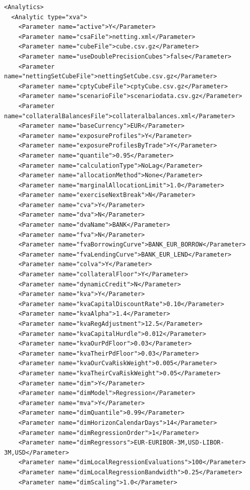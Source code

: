 \begin{listing}[H]
\begin{verbatim}
<Analytics>
  <Analytic type="xva">
    <Parameter name="active">Y</Parameter>
    <Parameter name="csaFile">netting.xml</Parameter>
    <Parameter name="cubeFile">cube.csv.gz</Parameter>
    <Parameter name="useDoublePrecisionCubes">false</Parameter>
    <Parameter name="nettingSetCubeFile">nettingSetCube.csv.gz</Parameter>
    <Parameter name="cptyCubeFile">cptyCube.csv.gz</Parameter>
    <Parameter name="scenarioFile">scenariodata.csv.gz</Parameter>
    <Parameter name="collateralBalancesFile">collateralbalances.xml</Parameter>
    <Parameter name="baseCurrency">EUR</Parameter>
    <Parameter name="exposureProfiles">Y</Parameter>
    <Parameter name="exposureProfilesByTrade">Y</Parameter>
    <Parameter name="quantile">0.95</Parameter>
    <Parameter name="calculationType">NoLag</Parameter>
    <Parameter name="allocationMethod">None</Parameter>
    <Parameter name="marginalAllocationLimit">1.0</Parameter>
    <Parameter name="exerciseNextBreak">N</Parameter>
    <Parameter name="cva">Y</Parameter>
    <Parameter name="dva">N</Parameter>
    <Parameter name="dvaName">BANK</Parameter>
    <Parameter name="fva">N</Parameter>
    <Parameter name="fvaBorrowingCurve">BANK_EUR_BORROW</Parameter>
    <Parameter name="fvaLendingCurve">BANK_EUR_LEND</Parameter>
    <Parameter name="colva">Y</Parameter>
    <Parameter name="collateralFloor">Y</Parameter>
    <Parameter name="dynamicCredit">N</Parameter>
    <Parameter name="kva">Y</Parameter>
    <Parameter name="kvaCapitalDiscountRate">0.10</Parameter>
    <Parameter name="kvaAlpha">1.4</Parameter>
    <Parameter name="kvaRegAdjustment">12.5</Parameter>
    <Parameter name="kvaCapitalHurdle">0.012</Parameter>
    <Parameter name="kvaOurPdFloor">0.03</Parameter>
    <Parameter name="kvaTheirPdFloor">0.03</Parameter>
    <Parameter name="kvaOurCvaRiskWeight">0.005</Parameter>
    <Parameter name="kvaTheirCvaRiskWeight">0.05</Parameter>
    <Parameter name="dim">Y</Parameter>
    <Parameter name="dimModel">Regression</Parameter>
    <Parameter name="mva">Y</Parameter>
    <Parameter name="dimQuantile">0.99</Parameter>
    <Parameter name="dimHorizonCalendarDays">14</Parameter>
    <Parameter name="dimRegressionOrder">1</Parameter>
    <Parameter name="dimRegressors">EUR-EURIBOR-3M,USD-LIBOR-3M,USD</Parameter>
    <Parameter name="dimLocalRegressionEvaluations">100</Parameter>
    <Parameter name="dimLocalRegressionBandwidth">0.25</Parameter>
    <Parameter name="dimScaling">1.0</Parameter>

\end{verbatim}
\end{listing}
